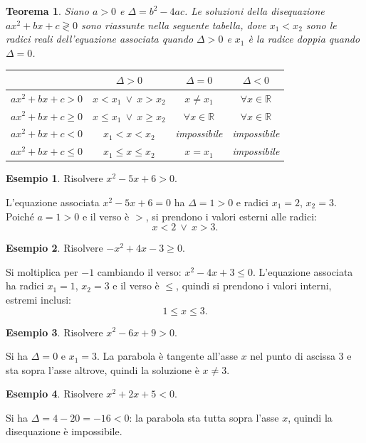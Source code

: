 \documentclass[12pt,a4paper,openany]{book}
\theoremstyle{definition}
\newtheorem{esempio}{Esempio}[section]
\theoremstyle{plain}
\newtheorem{teorema}{Teorema}[section]
\theoremstyle{remark}
\newcommand{\R}{\mathbb{R}}
\begin{document}
\begin{teorema}
Siano $a>0$ e $\Delta=b^2-4ac$. Le soluzioni della disequazione $ax^2+bx+c\gtrless 0$ sono riassunte nella seguente tabella, dove $x_1<x_2$ sono le radici reali dell'equazione associata quando $\Delta>0$ e $x_1$ è la radice doppia quando $\Delta=0$.
\begin{center}
\renewcommand{\arraystretch}{1.4}
\begin{tabular}{@{}cccc@{}}
\toprule
 & $\Delta>0$ & $\Delta=0$ & $\Delta<0$ \\
\midrule
$ax^2+bx+c>0$ & $x<x_1\ \lor\ x>x_2$ & $x\neq x_1$ & $\forall x\in\R$ \\
$ax^2+bx+c\ge 0$ & $x\le x_1\ \lor\ x\ge x_2$ & $\forall x\in\R$ & $\forall x\in\R$ \\
$ax^2+bx+c<0$ & $x_1<x<x_2$ & impossibile & impossibile \\
$ax^2+bx+c\le 0$ & $x_1\le x\le x_2$ & $x=x_1$ & impossibile \\
\bottomrule
\end{tabular}
\end{center}
\end{teorema}

\begin{esempio}
Risolvere $x^2-5x+6>0$.

L'equazione associata $x^2-5x+6=0$ ha $\Delta=1>0$ e radici $x_1=2$, $x_2=3$. Poiché $a=1>0$ e il verso è $>$, si prendono i valori esterni alle radici:
\[
x<2\ \lor\ x>3.
\]
\end{esempio}

\begin{esempio}
Risolvere $-x^2+4x-3\ge 0$.

Si moltiplica per $-1$ cambiando il verso: $x^2-4x+3\le 0$. L'equazione associata ha radici $x_1=1$, $x_2=3$ e il verso è $\le$, quindi si prendono i valori interni, estremi inclusi:
\[
1\le x\le 3.
\]
\end{esempio}

\begin{esempio}
Risolvere $x^2-6x+9>0$.

Si ha $\Delta=0$ e $x_1=3$. La parabola è tangente all'asse $x$ nel punto di ascissa $3$ e sta sopra l'asse altrove, quindi la soluzione è $x\neq 3$.
\end{esempio}

\begin{esempio}
Risolvere $x^2+2x+5<0$.

Si ha $\Delta=4-20=-16<0$: la parabola sta tutta sopra l'asse $x$, quindi la disequazione è impossibile.
\end{esempio}
\end{document}
